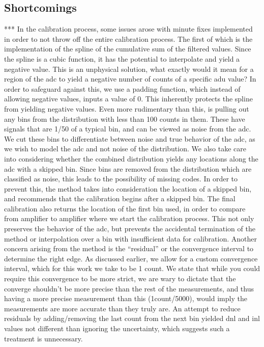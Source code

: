 \documentclass[11pt, letterpaper]{article}
\begin{document}
\subsection{Shortcomings}
***
In the calibration process, some issues arose with minute fixes implemented in order to not throw off the entire calibration process. The first of which is the implementation of the spline of the cumulative sum of the filtered values. Since the spline is a cubic function, it has the potential to interpolate and yield a negative value. This is an unphysical solution, what exactly would it mean for a region of the adc to yield a negative number of counts of a specific adu value? In order to safeguard against this, we use a padding function, which instead of allowing negative values, inputs a value of 0. This inherently protects the spline from yielding negative values. 
Even more rudimentary than this, is pulling out any bins from the distribution with less than 100 counts in them. These have signals that are 1/50 of a typical bin, and can be viewed as noise from the adc. We cut these bins to differentiate between noise and true behavior of the adc, as we wish to model the adc and not noise of the distribution. We also take care into considering whether the combined distribution yields any locations along the adc with a skipped bin. Since bins are removed from the distribution which are classified as noise, this leads to the possibility of missing codes. In order to prevent this, the method takes into consideration the location of a skipped bin, and recommends that the calibration begins after a skipped bin. The final calibration also returns the location of the first bin used, in order to compare from amplifier to amplifier where we start the calibration process. This not only preserves the behavior of the adc, but prevents the accidental termination of the method or interpolation over a bin with insufficient data for calibration. 
Another concern arising from the method is the “residual” or the convergence interval to determine the right edge. As discussed earlier, we allow for a custom convergence interval, which for this work we take to be 1 count. We state that while you could require this convergence to be more strict, we are wary to dictate that the converge shouldn’t be more precise than the rest of the measurements, and thus having a more precise measurement than this (1count/5000), would imply the measurements are more accurate than they truly are. An attempt to reduce residuals by adding/removing the last count from the next bin yielded dnl and inl values not different than ignoring the uncertainty, which suggests such a treatment is unnecessary. 
\end{document}
